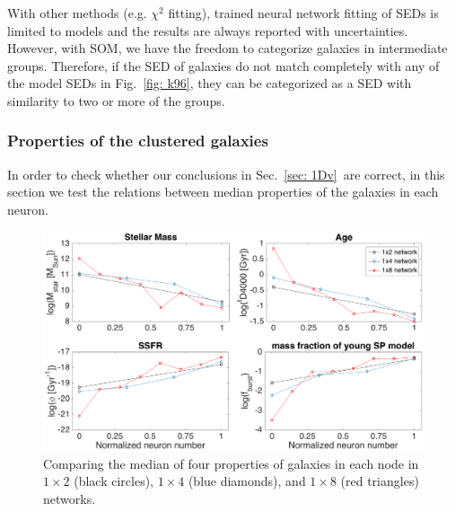             With other methods (e.g. $\chi^2$ fitting), trained neural network fitting of SEDs is limited to models and the results are always reported with uncertainties.
            However, with SOM, we have the freedom to categorize galaxies in intermediate groups.
            Therefore, if the SED of galaxies do not match completely with any of the model SEDs in Fig.~\ref{fig: k96}, they can be categorized as a SED with similarity to two or more of the groups.

                        
        
        
        \subsubsection{Properties of the clustered galaxies}
        
        In order to check whether our conclusions in Sec.~\ref{sec: 1Dv}~are correct, in this section we test the relations between median properties of the galaxies in each neuron.
        
        \begin{figure}
            \centering
            \includegraphics[width=\textwidth]{../image_paper2/1d/props5.png}
            \caption{Comparing the median of four properties of galaxies in each node in $1\times2$ (black circles), $1\times4$ (blue diamonds), and $1\times8$ (red triangles) networks.}
            \label{fig: props}
        \end{figure}
       
